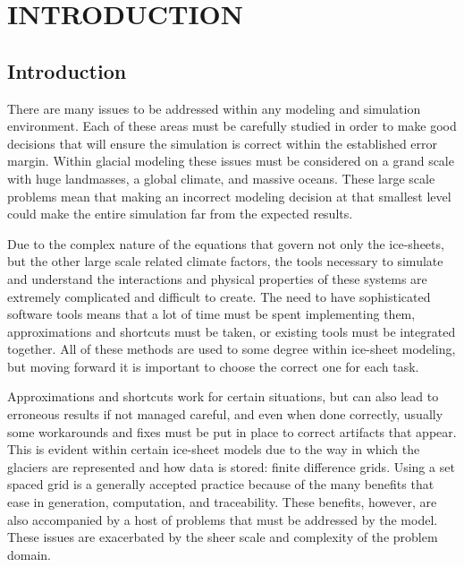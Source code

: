 
\chapter{INTRODUCTION}\label{ch:intro}

\section{Introduction}\label{sec:chp1intro}

There are many issues to be addressed within any modeling and simulation environment.  Each of these areas must be carefully studied in order to make good decisions that will ensure the simulation is correct within the established error margin.  Within glacial modeling these issues must be considered on a grand scale with huge landmasses, a global climate, and massive oceans. These large scale problems mean that making an incorrect modeling decision at that smallest level could make the entire simulation far from the expected results.

Due to the complex nature of the equations that govern not only the ice-sheets, but the other large scale related climate factors, the tools necessary to simulate and understand the interactions and physical properties of these systems are extremely complicated and difficult to create.  The need to have sophisticated software tools means that a lot of time must be spent implementing them, approximations and shortcuts must be taken, or existing tools must be integrated together.  All of these methods are used to some degree within ice-sheet modeling, but moving forward it is important to choose the correct one for each task.

Approximations and shortcuts work for certain situations, but can also lead to erroneous results if not managed careful, and even when done correctly, usually some workarounds and fixes must be put in place to correct artifacts that appear.  This is evident within certain ice-sheet models due to the way in which the glaciers are represented and how data is stored:  finite difference grids. Using a set spaced grid is a generally accepted practice because of the many benefits that ease in generation, computation, and traceability.  These benefits, however, are also accompanied by a host of problems that must be addressed by the model.  These issues are exacerbated by the sheer scale and complexity of the problem domain.

